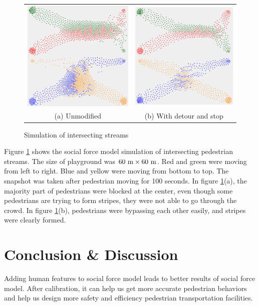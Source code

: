 \documentclass{article}
\begin{document}
            \begin{figure}[htb]
                \centering
                \begin{tabular}{cc}
                    \includegraphics[natwidth=960,natheight=962,width=6cm]{img/stripe1.png} &
                    \includegraphics[natwidth=962,natheight=960,width=6cm]{img/stripe2.png} \\
                    (a) Unmodified & (b) With detour and stop \\
                \end{tabular}
                \caption{Simulation of intersecting streams}
                \label{img_stripe}
            \end{figure}

            Figure \ref{img_stripe} shows the social force model simulation of intersecting pedestrian streams. The size of playground was $60\rm{\ m}\times 60\rm{\ m}$.
            Red and green were moving from left to right. Blue and yellow were moving from bottom to top.
            The snapshot was taken after pedestrian moving for 100 seconds.
            In figure \ref{img_stripe}(a), the majority part of pedestrians were blocked at the center, even though some pedestrians are trying to form stripes, they were not able to go through the crowd. In figure \ref{img_stripe}(b), pedestrians were bypassing each other easily, and stripes were clearly formed.
        \section{Conclusion \& Discussion}
            Adding human features to social force model leads to better results of social force model. After calibration, it can help us get more accurate pedestrian behaviors and help us design more safety and efficiency pedestrian transportation facilities.
	\renewcommand\refname{Reference}
	
\end{document}
